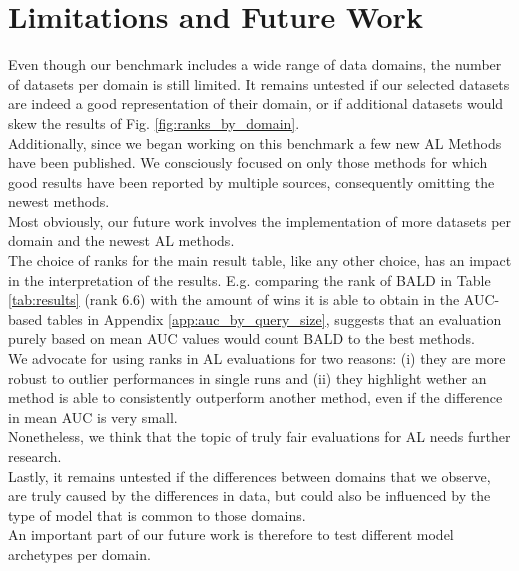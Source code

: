 \documentclass[]{article}
\begin{document}
 
 \section{Limitations and Future Work}\label{app:future_work}
 Even though our benchmark includes a wide range of data domains, the number of datasets per domain is still limited.
 It remains untested if our selected datasets are indeed a good representation of their domain, or if additional datasets would skew the results of Fig. \ref{fig:ranks_by_domain}. \\ 
 Additionally, since we began working on this benchmark a few new AL Methods have been published.
 We consciously focused on only those methods for which good results have been reported by multiple sources, consequently omitting the newest methods. \\
 Most obviously, our future work involves the implementation of more datasets per domain and the newest AL methods. \\ [1mm]
 The choice of ranks for the main result table, like any other choice, has an impact in the interpretation of the results.
 E.g. comparing the rank of BALD in Table \ref{tab:results} (rank 6.6) with the amount of wins it is able to obtain in the AUC-based tables in Appendix \ref{app:auc_by_query_size}, suggests that an evaluation purely based on mean AUC values would count BALD to the best methods. \\
 We advocate for using ranks in AL evaluations for two reasons: (i) they are more robust to outlier performances in single runs and (ii) they highlight wether an method is able to consistently outperform another method, even if the difference in mean AUC is very small. \\
 Nonetheless, we think that the topic of truly fair evaluations for AL needs further research. \\ [1mm]
 Lastly, it remains untested if the differences between domains that we observe, are truly caused by the differences in data, but could also be influenced by the type of model that is common to those domains. \\
 An important part of our future work is therefore to test different model archetypes per domain.
 
\end{document}
